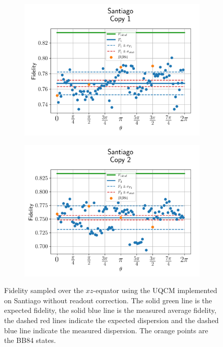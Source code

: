 \begin{figure}[H]
    \centering
    \begin{subfigure}{.45\textwidth}
      \centering
      \includegraphics[width=\textwidth]{Figures/UQCM/IBM/OnlyEquator/results_santiago_copy1.png}
    \end{subfigure}%
    \begin{subfigure}{.45\textwidth}
      \centering
      \includegraphics[width=\textwidth]{Figures/UQCM/IBM/OnlyEquator/results_santiago_copy2.png}
    \end{subfigure}
    \caption{Fidelity sampled over the $xz$-equator using the UQCM implemented on Santiago without readout correction. The solid green line is the expected fidelity, the solid blue line is the measured average fidelity, the dashed red lines indicate the expected dispersion and the dashed blue line indicate the measured dispersion. The orange points are the BB84 states.}
\end{figure}

